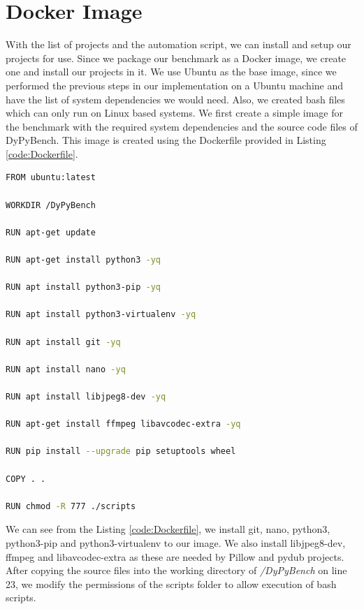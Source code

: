 \section{Docker Image}
\label{impl:Docker Image}
With the list of projects and the automation script, we can install and setup our projects for use.
Since we package our benchmark as a Docker image, we create one and install our projects in it.
We use Ubuntu as the base image, since we performed the previous steps in our implementation on a Ubuntu machine and have the list of system dependencies we would need.
Also, we created bash files which can only run on Linux based systems.
We first create a simple image for the benchmark with the required system dependencies and the source code files of DyPyBench.
This image is created using the Dockerfile provided in Listing \ref{code:Dockerfile}.
\begin{lstlisting}[caption=Dockerfile.,label=code:Dockerfile,language=Bash]
FROM ubuntu:latest

WORKDIR /DyPyBench

RUN apt-get update

RUN apt-get install python3 -yq

RUN apt install python3-pip -yq

RUN apt install python3-virtualenv -yq

RUN apt install git -yq

RUN apt install nano -yq

RUN apt install libjpeg8-dev -yq

RUN apt-get install ffmpeg libavcodec-extra -yq

RUN pip install --upgrade pip setuptools wheel

COPY . .

RUN chmod -R 777 ./scripts 
\end{lstlisting}

We can see from the Listing \ref{code:Dockerfile}, we install git, nano, python3, python3-pip and python3-virtualenv to our image.
We also install libjpeg8-dev, ffmpeg and libavcodec-extra as these are needed by Pillow and pydub projects.
After copying the source files into the working directory of \textit{/DyPyBench} on line 23, we modify the permissions of the scripts folder to allow execution of bash scripts.

